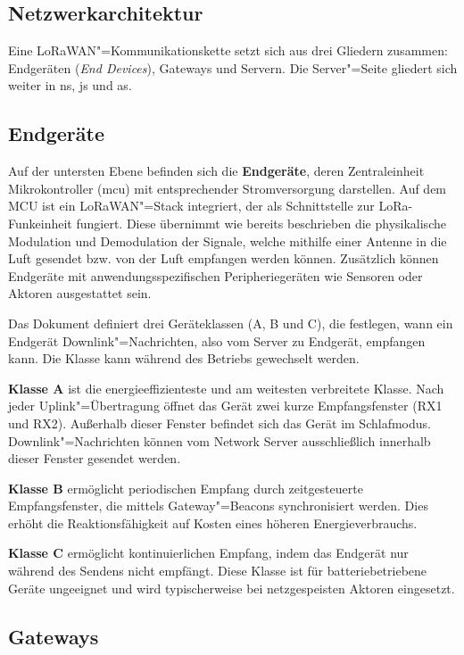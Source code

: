 \subsection{Netzwerkarchitektur}
\label{subsec:netzwerkarchitektur}

Eine LoRaWAN"=Kommunikationskette setzt sich aus drei Gliedern zusammen: Endgeräten (\textit{End Devices}), Gateways und Servern. 
Die Server"=Seite gliedert sich weiter in \acrfull{ns}, \acrfull{js} und \acrfull{as}. %

\subsection{Endgeräte}

Auf der untersten Ebene befinden sich die \textbf{Endgeräte}, deren Zentraleinheit Mikrokontroller (\acrshort{mcu}) mit entsprechender
Stromversorgung darstellen. Auf dem MCU ist ein LoRaWAN"=Stack integriert, der als Schnittstelle zur LoRa-Funkeinheit fungiert.
Diese übernimmt wie bereits beschrieben die physikalische Modulation und Demodulation der Signale, welche mithilfe einer Antenne
in die Luft gesendet bzw. von der Luft empfangen werden können. Zusätzlich können Endgeräte mit anwendungsspezifischen Peripheriegeräten 
wie Sensoren oder Aktoren ausgestattet sein. 

Das Dokument  definiert drei Geräteklassen (A, B und C), die festlegen,
wann ein Endgerät Downlink"=Nachrichten, also vom Server zu Endgerät, empfangen kann. Die Klasse kann während des
Betriebs gewechselt werden.

\textbf{Klasse A} ist die energieeffizienteste und am weitesten verbreitete Klasse.
Nach jeder Uplink"=Übertragung öffnet das Gerät zwei kurze Empfangsfenster
(RX1 und RX2). Außerhalb dieser Fenster befindet sich das Gerät im Schlafmodus.
Downlink"=Nachrichten können vom Network Server ausschließlich innerhalb dieser
Fenster gesendet werden.

\textbf{Klasse B} ermöglicht periodischen Empfang durch zeitgesteuerte Empfangsfenster,
die mittels Gateway"=Beacons synchronisiert werden. Dies erhöht die Reaktionsfähigkeit
auf Kosten eines höheren Energieverbrauchs.

\textbf{Klasse C} ermöglicht kontinuierlichen Empfang, indem das Endgerät nur während
des Sendens nicht empfängt. Diese Klasse ist für batteriebetriebene Geräte ungeeignet
und wird typischerweise bei netzgespeisten Aktoren eingesetzt.

\subsection{Gateways}

